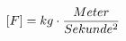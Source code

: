 \documentclass[preview]{standalone}
\begin{document}
\begin{align*}
\special{dvisvgm:raw <g id='unique000'>}[F] = kg \cdot \frac{Meter}{Sekunde^{2}}\special{dvisvgm:raw </g>}
\end{align*}
\end{document}
